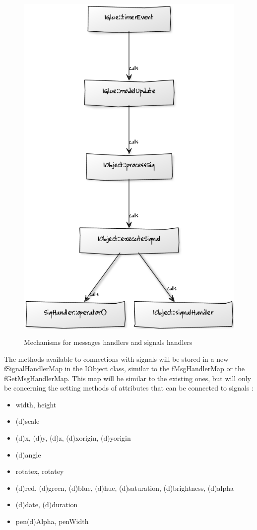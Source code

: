 \documentclass[a4paper]{article}
\begin{document}
\begin{figure}[h]
\includegraphics[height=18cm]{img/schema2.png}
\caption{Mechanisms for messages handlers and signals handlers}
\label{fig:handler}
\end{figure}

The methods available to connections with signals will be stored in a new fSignalHandlerMap in the IObject class, similar to the fMsgHandlerMap or the fGetMsgHandlerMap. This map will be similar to the existing ones, but will only be concerning the setting methods of attributes that can be connected to signals :

\begin{itemize}
  \item width, height
  \item (d)scale
  \item (d)x, (d)y, (d)z, (d)xorigin, (d)yorigin
  \item (d)angle
  \item rotatex, rotatey
  \item (d)red, (d)green, (d)blue, (d)hue, (d)saturation, (d)brightness, (d)alpha
  \item (d)date, (d)duration
  \item pen(d)Alpha, penWidth
\end{itemize}
\end{document}
